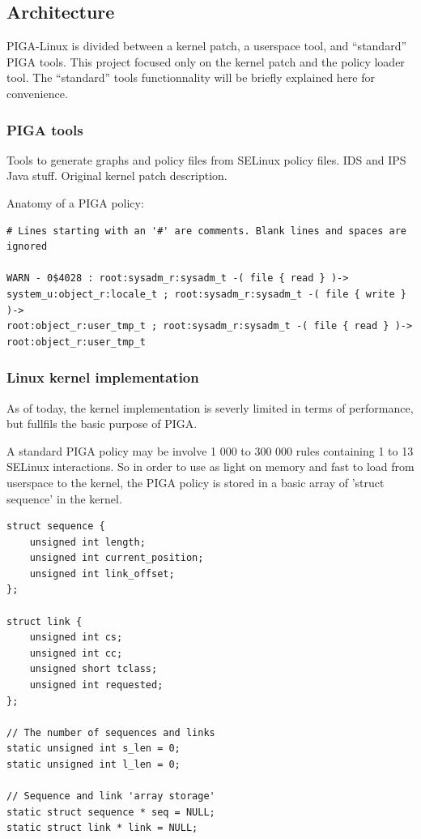 \documentclass[pdftex,a4paper,titlepage,11pt]{article}
\begin{document}
\subsection{Architecture}

PIGA-Linux is divided between a kernel patch, a userspace tool, and ``standard''
PIGA tools. This project focused only on the kernel patch and the policy loader
tool. The ``standard'' tools functionnality will be briefly explained here for
convenience.

\subsubsection{PIGA tools}

Tools to generate graphs and policy files from SELinux policy files. IDS and IPS
Java stuff. Original kernel patch description.

Anatomy of a PIGA policy:

\begin{lstlisting}
# Lines starting with an '#' are comments. Blank lines and spaces are ignored

WARN - 0$4028 : root:sysadm_r:sysadm_t -( file { read } )->
system_u:object_r:locale_t ; root:sysadm_r:sysadm_t -( file { write } )->
root:object_r:user_tmp_t ; root:sysadm_r:sysadm_t -( file { read } )->
root:object_r:user_tmp_t
\end{lstlisting}


\subsubsection{Linux kernel implementation}

As of today, the kernel implementation is severly limited in terms of
performance, but fullfils the basic purpose of PIGA.

\bigskip

A standard PIGA policy may be involve 1 000 to 300 000 rules containing 1 to 13
SELinux interactions. So in order to use as light on memory and fast to load
from userspace to the kernel, the PIGA policy is stored in a basic array of
'struct sequence' in the kernel.

\begin{lstlisting}
struct sequence {
	unsigned int length;
	unsigned int current_position;
	unsigned int link_offset;
};

struct link {
	unsigned int cs;
	unsigned int cc;
	unsigned short tclass;
	unsigned int requested;
};

// The number of sequences and links
static unsigned int s_len = 0;
static unsigned int l_len = 0;

// Sequence and link 'array storage'
static struct sequence * seq = NULL;
static struct link * link = NULL;
\end{lstlisting}
\end{document}
